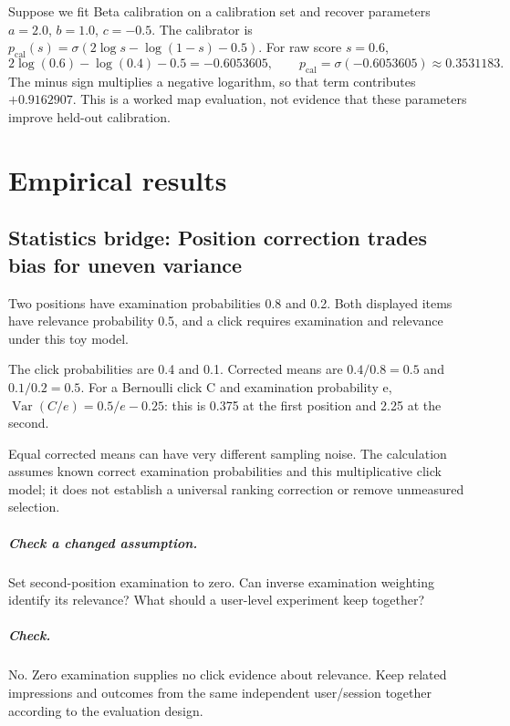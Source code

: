 \documentclass[11pt,oneside]{scrbook}
\begin{document}
Suppose we fit Beta calibration on a calibration set and recover
parameters $a = 2.0$, $b = 1.0$, $c = -0.5$. The calibrator is
$p_{\mathrm{cal}}(s) = \sigma(2 \log s - \log(1 - s) - 0.5)$.
For raw score $s=0.6$,
\[
2\log(0.6)-\log(0.4)-0.5=-0.6053605,
\qquad p_{\mathrm{cal}}=\sigma(-0.6053605)\approx0.3531183.
\]
The minus sign multiplies a negative logarithm, so that term contributes
$+0.9162907$. This is a worked map evaluation, not evidence that these
parameters improve held-out calibration.


\chapter{Empirical results}

\section{Statistics bridge: Position correction trades bias for uneven variance}
\begin{example}
Two positions have examination probabilities 0.8 and 0.2. Both displayed items have relevance probability 0.5, and a click requires examination and relevance under this toy model.

The click probabilities are 0.4 and 0.1. Corrected means are $0.4/0.8=0.5$ and $0.1/0.2=0.5$. For a Bernoulli click C and examination probability e, $\operatorname{Var}(C/e)=0.5/e-0.25$: this is 0.375 at the first position and 2.25 at the second.
\end{example}
Equal corrected means can have very different sampling noise. The calculation assumes known correct examination probabilities and this multiplicative click model; it does not establish a universal ranking correction or remove unmeasured selection.

\paragraph{Check a changed assumption.} Set second-position examination to zero. Can inverse examination weighting identify its relevance? What should a user-level experiment keep together?
\paragraph{Check.} No. Zero examination supplies no click evidence about relevance. Keep related impressions and outcomes from the same independent user/session together according to the evaluation design.
\end{document}

